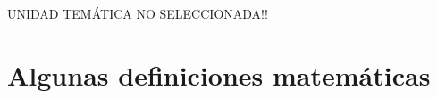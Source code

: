 \documentclass[12pt]{article}
\theoremstyle{definition}
\theoremstyle{definition}
\theoremstyle{definition}
\theoremstyle{definition}
\theoremstyle{definition}
\newcommand{\unidadtem}{0}
\begin{document}
\ifcase%
\unidadtem{} {
        
        \newpage
        
        \newpage
        
        \newpage
        
        \newpage
        
        \newpage
        
        \newpage
        
        \newpage
        
    }
    \or 
    \or 
    \or 
    \or 
    \or 
    \or 
    \or 
    \or 
    \else UNIDAD TEMÁTICA NO SELECCIONADA!!
\fi

\newpage

\appendix


\section{Algunas definiciones matemáticas}


\printbibliography
{}
\end{document}
